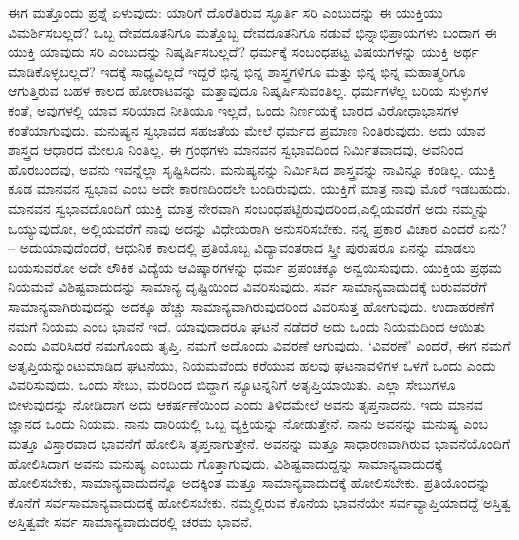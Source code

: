 ಈಗ ಮತ್ತೊಂದು ಪ್ರಶ್ನೆ ಏಳುವುದು: ಯಾರಿಗೆ ದೊರೆತಿರುವ ಸ್ಫೂರ್ತಿ ಸರಿ ಎಂಬುದನ್ನು ಈ ಯುಕ್ತಿಯು ವಿಮರ್ಶಿಸಬಲ್ಲದೆ? ಒಬ್ಬ ದೇವದೂತನಿಗೂ ಮತ್ತೊಬ್ಬ ದೇವದೂತನಿಗೂ ನಡುವೆ ಭಿನ್ನಾಭಿಪ್ರಾಯಗಳು ಬಂದಾಗ ಈ ಯುಕ್ತಿ ಯಾವುದು ಸರಿ ಎಂಬುದನ್ನು ನಿಷ್ಕರ್ಷಿಸಬಲ್ಲದೆ? ಧರ್ಮಕ್ಕೆ ಸಂಬಂಧಪಟ್ಟ ವಿಷಯಗಳನ್ನು ಯುಕ್ತಿ ಅರ್ಥ ಮಾಡಿಕೊಳ್ಳಬಲ್ಲದೆ? ಇದಕ್ಕೆ ಸಾಧ್ಯವಿಲ್ಲದೆ ಇದ್ದರೆ ಭಿನ್ನ ಭಿನ್ನ ಶಾಸ್ತ್ರಗಳಿಗೂ ಮತ್ತು ಭಿನ್ನ ಭಿನ್ನ ಮಹಾತ್ಮರಿಗೂ ಆಗುತ್ತಿರುವ ಬಹಳ ಕಾಲದ ಹೋರಾಟವನ್ನು ಮತ್ತಾವುದೂ ನಿಷ್ಕರ್ಷಿಸುವಂತಿಲ್ಲ. ಧರ್ಮಗಳೆಲ್ಲ ಬರಿಯ ಸುಳ್ಳುಗಳ ಕಂತೆ, ಅವುಗಳಲ್ಲಿ ಯಾವ ಸರಿಯಾದ ನೀತಿಯೂ ಇಲ್ಲದೆ, ಒಂದು ನಿರ್ಣಯಕ್ಕೆ ಬಾರದ ವಿರೋಧಾಭಾಸಗಳ ಕಂತೆಯಾಗುವುದು. ಮನುಷ್ಯನ ಸ್ವಭಾವದ ಸಹಜತೆಯ ಮೇಲೆ ಧರ್ಮದ ಪ್ರಮಾಣ ನಿಂತಿರುವುದು. ಅದು ಯಾವ ಶಾಸ್ತ್ರದ ಆಧಾರದ ಮೇಲೂ ನಿಂತಿಲ್ಲ. ಈ ಗ್ರಂಥಗಳು ಮಾನವನ ಸ್ವಭಾವದಿಂದ ನಿರ್ಮಿತವಾದವು, ಅವನಿಂದ ಹೊರಬಂದವು, ಅವನು ಇವನ್ನೆಲ್ಲಾ ಸೃಷ್ಟಿಸಿದನು. ಮನುಷ್ಯನನ್ನು ನಿರ್ಮಿಸಿದ ಶಾಸ್ತ್ರವನ್ನು ನಾವಿನ್ನೂ ಕಂಡಿಲ್ಲ. ಯುಕ್ತಿ ಕೂಡ ಮಾನವನ ಸ್ವಭಾವ ಎಂಬ ಅದೇ ಕಾರಣದಿಂದಲೇ ಬಂದಿರುವುದು. ಯುಕ್ತಿಗೆ ಮಾತ್ರ ನಾವು ಮೊರೆ ಇಡಬಹುದು. ಮಾನವನ ಸ್ವಭಾವದೊಂದಿಗೆ ಯುಕ್ತಿ ಮಾತ್ರ ನೇರವಾಗಿ ಸಂಬಂಧಪಟ್ಟಿರುವುದರಿಂದ,\break ಎಲ್ಲಿಯವರೆಗೆ ಅದು ನಮ್ಮನ್ನು ಒಯ್ಯುವುದೋ, ಅಲ್ಲಿಯವರೆಗೆ ನಾವು ಅದನ್ನು ವಿಧೇಯರಾಗಿ ಅನುಸರಿಸಬೇಕು. ನನ್ನ ಪ್ರಕಾರ ವಿಚಾರ ಎಂದರೆ ಏನು? – ಅದು\break ಯಾವುದೆಂದರೆ, ಆಧುನಿಕ ಕಾಲದಲ್ಲಿ ಪ್ರತಿಯೊಬ್ಬ ವಿದ್ಯಾವಂತರಾದ ಸ್ತ್ರೀ ಪುರುಷರೂ ಏನನ್ನು ಮಾಡಲು ಬಯಸುವರೋ ಅದೇ ಲೌಕಿಕ ವಿದ್ಯೆಯ ಆವಿಷ್ಕಾರಗಳನ್ನು ಧರ್ಮ ಪ್ರಪಂಚಕ್ಕೂ ಅನ್ವಯಿಸುವುದು. ಯುಕ್ತಿಯ ಪ್ರಥಮ ನಿಯಮವೆ ವಿಶಿಷ್ಟವಾದುದನ್ನು  ಸಾಮಾನ್ಯ ದೃಷ್ಟಿಯಿಂದ  ವಿವರಿಸುವುದು. ಸರ್ವ ಸಾಮಾನ್ಯವಾದುದಕ್ಕೆ ಬರುವವರೆಗೆ ಸಾಮಾನ್ಯವಾಗಿರುವುದನ್ನು ಅದಕ್ಕೂ ಹೆಚ್ಚು ಸಾಮಾನ್ಯವಾಗಿರುವುದರಿಂದ ವಿವರಿಸುತ್ತ ಹೋಗುವುದು. ಉದಾಹರಣೆಗೆ ನಮಗೆ ನಿಯಮ ಎಂಬ ಭಾವನೆ ಇದೆ. ಯಾವುದಾದರೂ ಘಟನೆ ನಡೆದರೆ ಅದು ಒಂದು ನಿಯಮದಿಂದ ಆಯಿತು ಎಂದು ವಿವರಿಸಿದರೆ ನಮಗೊಂದು ತೃಪ್ತಿ. ನಮಗೆ ಅದೊಂದು ವಿವರಣೆ ಆಗುವುದು. `ವಿವರಣೆ' ಎಂದರೆ, ಈಗ ನಮಗೆ ಅತೃಪ್ತಿಯನ್ನುಂಟುಮಾಡಿದ ಘಟನೆಯು, ನಿಯಮವೆಂದು ಕರೆಯುವ ಹಲವು ಘಟನಾವಳಿಗಳ ಒಳಗೆ ಒಂದು ಎಂದು ವಿವರಿಸುವುದು. ಒಂದು ಸೇಬು, ಮರದಿಂದ ಬಿದ್ದಾಗ ನ್ಯೂಟನ್ನನಿಗೆ ಅತೃಪ್ತಿಯಾಯಿತು. ಎಲ್ಲಾ ಸೇಬುಗಳೂ ಬೀಳುವುದನ್ನು ನೋಡಿದಾಗ ಅದು ಆಕರ್ಷಣೆಯಿಂದ ಎಂದು ತಿಳಿದಮೇಲೆ ಅವನು ತೃಪ್ತನಾದನು. ಇದು ಮಾನವ ಜ್ಞಾನದ ಒಂದು ನಿಯಮ. ನಾನು ದಾರಿಯಲ್ಲಿ ಒಬ್ಬ ವ್ಯಕ್ತಿಯನ್ನು ನೋಡುತ್ತೇನೆ. ನಾನು ಅವನನ್ನು ಮನುಷ್ಯ ಎಂಬ ಮತ್ತೂ ವಿಸ್ತಾರವಾದ ಭಾವನೆಗೆ ಹೋಲಿಸಿ ತೃಪ್ತನಾಗುತ್ತೇನೆ. ಅವನನ್ನು ಮತ್ತೂ ಸಾಧಾರಣವಾಗಿರುವ ಭಾವನೆಯೊಂದಿಗೆ ಹೋಲಿಸಿದಾಗ ಅವನು ಮನುಷ್ಯ ಎಂಬುದು ಗೊತ್ತಾಗುವುದು. ವಿಶಿಷ್ಟವಾದುದ್ದನ್ನು ಸಾಮಾನ್ಯವಾದುದಕ್ಕೆ ಹೋಲಿಸಬೇಕು, ಸಾಮಾನ್ಯವಾದುದನ್ನೊ ಅದಕ್ಕಿಂತ ಮತ್ತೂ ಸಾಮಾನ್ಯವಾದುದಕ್ಕೆ ಹೋಲಿಸಬೇಕು. ಪ್ರತಿಯೊಂದನ್ನು ಕೊನೆಗೆ ಸರ್ವಸಾಮಾನ್ಯವಾದುದಕ್ಕೆ ಹೋಲಿಸಬೇಕು. ನಮ್ಮಲ್ಲಿರುವ ಕೊನೆಯ ಭಾವನೆಯೇ  ಸರ್ವವ್ಯಾಪ್ತಿಯಾದದ್ದೆ ಅಸ್ತಿತ್ವ\break {} ಅಸ್ತಿತ್ವವೇ ಸರ್ವ ಸಾಮಾನ್ಯವಾದುದರಲ್ಲಿ ಚರಮ ಭಾವನೆ.

